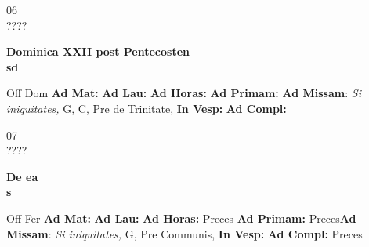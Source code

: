 \documentclass[10pt, openany]{book}
\begin{document}
    \begin{center}
        \begin{minipage}{3.5in}
            \vspace{2em}
            \begin{minipage}{0.5in}
                {\Huge 06} \\
                {\normalsize ????}
            \end{minipage}
            \begin{minipage}{3.0in}
                \textbf{ \large Dominica XXII post Pentecosten \\
                \textnormal{\normalsize sd}}

            \end{minipage}
            \begin{justify}Off Dom
                \textbf{Ad Mat: }
                \textbf{Ad Lau: }
                \textbf{Ad Horas: }
                \textbf{Ad Primam: }\textbf{Ad Missam}: \textit{Si iniquitates,} G, C, Pre de Trinitate, 
                \textbf{In Vesp: }
                \textbf{Ad Compl: }
            \end{justify}
        \end{minipage}
    \end{center}

    \begin{center}
        \begin{minipage}{3.5in}
            \vspace{2em}
            \begin{minipage}{0.5in}
                {\Huge 07} \\
                {\normalsize ????}
            \end{minipage}
            \begin{minipage}{3.0in}
                \textbf{ \large De ea \\
                \textnormal{\normalsize s}}

            \end{minipage}
            \begin{justify}Off Fer
                \textbf{Ad Mat: }
                \textbf{Ad Lau: }
                \textbf{Ad Horas: }Preces
                \textbf{Ad Primam: }Preces\textbf{Ad Missam}: \textit{Si iniquitates,} G, Pre Communis, 
                \textbf{In Vesp: }
                \textbf{Ad Compl: }Preces
            \end{justify}
        \end{minipage}
    \end{center}
\end{document}
